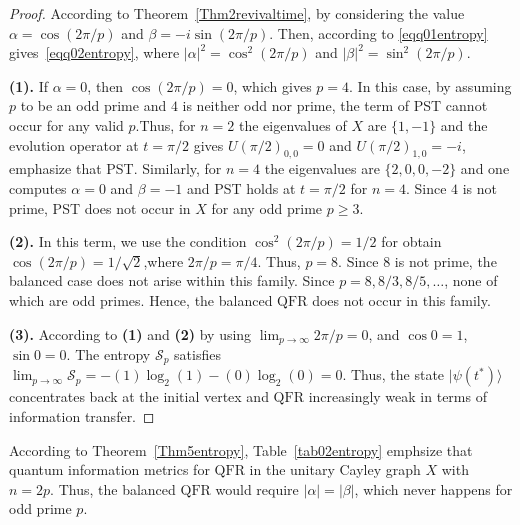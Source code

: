 \documentclass[12pt]{amsart}
\newcommand{\QFR}{\mathrm{QFR}}
\begin{document}
\begin{proof}
According to Theorem~\ref{Thm2revivaltime}, by considering the value 
  $\alpha = \cos(2\pi/p)$ and $\beta = -i\sin(2\pi/p)$. Then, according to \eqref{eqq01entropy}
  gives~\eqref{eqq02entropy}, where $|\alpha|^2 = \cos^2(2\pi/p)$ and
  $|\beta|^2 = \sin^2(2\pi/p)$.

  \noindent\textbf{(1).} If $\alpha = 0$, then $\cos(2\pi/p) = 0$, which
  gives $p=4$. In this case, by assuming  $p$ to be an odd prime and $4$ is neither odd nor prime, the term of  PST cannot occur for any valid $p$.Thus, for $n=2$ the eigenvalues of $X$ are $\{1, -1\}$ and
  the evolution operator at $t=\pi/2$ gives $U(\pi/2)_{0,0} = 0$ and
  $U(\pi/2)_{1,0} = -i$, emphasize that PST. Similarly, for $n=4$ 
  the eigenvalues are $\{2, 0, 0, -2\}$ and one computes $\alpha=0$ and $\beta=-1$ and PST holds
  at $t=\pi/2$ for $n=4$. Since $4$ is not prime, PST does not occur in $X$ for any odd prime $p \geq 3$.

  \noindent\textbf{(2).} In this term, we use the condition $\cos^2(2\pi/p) = 1/2$ for obtain
  $\cos(2\pi/p) = 1/\sqrt{2}$,where $2\pi/p = \pi/4$. Thus, $p=8$. Since $8$ is not prime, the balanced case does not arise within this family. Since $p = 8, 8/3, 8/5, \ldots$, none of which are odd primes. Hence, the  balanced $\QFR$ does not occur in this family.

  \noindent\textbf{(3).}  According to \textbf{(1)} and \textbf{(2)} by using $\lim_{p \to \infty} 2\pi/p = 0$,
  and $\cos 0 = 1$, $\sin 0 = 0$. The entropy $\mathcal{S}_p$ satisfies
  $\lim_{p \to \infty} \mathcal{S}_p = -(1)\log_2(1) - (0)\log_2(0) = 0$. Thus, the state
    $|\psi(t^*)\rangle$ concentrates back at the initial vertex and $\QFR$ increasingly
    weak in terms of information transfer.
\end{proof}

According to Theorem~\ref{Thm5entropy}, Table~\ref{tab02entropy} emphsize that quantum information metrics for $\QFR$ in the unitary Cayley graph
$X$ with $n=2p$. Thus, the balanced $\QFR$ would require $|\alpha| = |\beta|$, which never happens for odd prime $p$.
\end{document}
